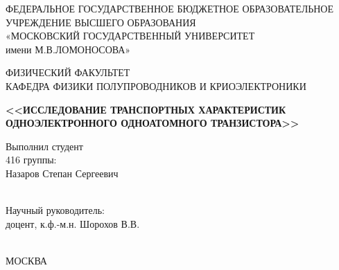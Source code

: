 \documentclass[12pt,a4paper]{report}
\renewcommand{\small}{\fontsize{12}{14.5pt}\selectfont}
\renewcommand{\normalsize}{\fontsize{14}{18pt}\selectfont}
\begin{document}
\setlength{\parindent}{1.25cm} 
\sloppy   

\onehalfspacing  
\thispagestyle{empty}
\begin{titlepage}
\begin{center}
ФЕДЕРАЛЬНОЕ ГОСУДАРСТВЕННОЕ БЮДЖЕТНОЕ ОБРАЗОВАТЕЛЬНОЕ
УЧРЕЖДЕНИЕ ВЫСШЕГО ОБРАЗОВАНИЯ \\
«МОСКОВСКИЙ ГОСУДАРСТВЕННЫЙ УНИВЕРСИТЕТ\\
имени М.В.ЛОМОНОСОВА»
\vspace{1cm}

ФИЗИЧЕСКИЙ ФАКУЛЬТЕТ\\
\vspace{1cm}
КАФЕДРА ФИЗИКИ ПОЛУПРОВОДНИКОВ И КРИОЭЛЕКТРОНИКИ\\

\vspace{1cm}


\vspace{1cm}

\textbf{<<ИССЛЕДОВАНИЕ ТРАНСПОРТНЫХ ХАРАКТЕРИСТИК ОДНОЭЛЕКТРОННОГО ОДНОАТОМНОГО ТРАНЗИСТОРА>>}


\end{center}


\begin{flushright}
\vspace{1cm}

Выполнил студент \\
416 группы:\\

Назаров Степан Сергеевич \\

\underline{\hspace{3cm}}\\

\vspace{1cm}

Научный руководитель:\\
доцент, к.ф.\--м.н. Шорохов В.В. \\
\underline{\hspace{3cm}}\\
 
\end{flushright}

\vspace{1cm}
\begin{flushleft}

\vspace{1cm}
\end{flushleft}
\begin{center}
\vspace{1cm}
\small МОСКВА \\ \number\year\normalsize
\end{center}
\end{titlepage}
\end{document}
